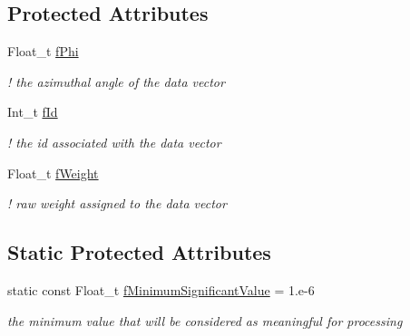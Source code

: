 \subsection*{Protected Attributes}
\begin{DoxyCompactItemize}
\item 
\mbox{\label{classQn_1_1CorrectionDataVector_a6c21e4c45bfb08a6451e173b4df5f943}} 
Float\+\_\+t \mbox{\hyperlink{classQn_1_1CorrectionDataVector_a6c21e4c45bfb08a6451e173b4df5f943}{f\+Phi}}
\begin{DoxyCompactList}\small\item\em ! the azimuthal angle of the data vector \end{DoxyCompactList}\item 
\mbox{\label{classQn_1_1CorrectionDataVector_ae06da92950b38fb4e08c3064865de842}} 
Int\+\_\+t \mbox{\hyperlink{classQn_1_1CorrectionDataVector_ae06da92950b38fb4e08c3064865de842}{f\+Id}}
\begin{DoxyCompactList}\small\item\em ! the id associated with the data vector \end{DoxyCompactList}\item 
\mbox{\label{classQn_1_1CorrectionDataVector_a11619b9eb4043f1b90abdcfa080fd09f}} 
Float\+\_\+t \mbox{\hyperlink{classQn_1_1CorrectionDataVector_a11619b9eb4043f1b90abdcfa080fd09f}{f\+Weight}}
\begin{DoxyCompactList}\small\item\em ! raw weight assigned to the data vector \end{DoxyCompactList}\end{DoxyCompactItemize}
\subsection*{Static Protected Attributes}
\begin{DoxyCompactItemize}
\item 
\mbox{\label{classQn_1_1CorrectionDataVector_a2a78df7f47caa805c4658f35157a2897}} 
static const Float\+\_\+t \mbox{\hyperlink{classQn_1_1CorrectionDataVector_a2a78df7f47caa805c4658f35157a2897}{f\+Minimum\+Significant\+Value}} = 1.e-\/6
\begin{DoxyCompactList}\small\item\em the minimum value that will be considered as meaningful for processing \end{DoxyCompactList}\end{DoxyCompactItemize}



